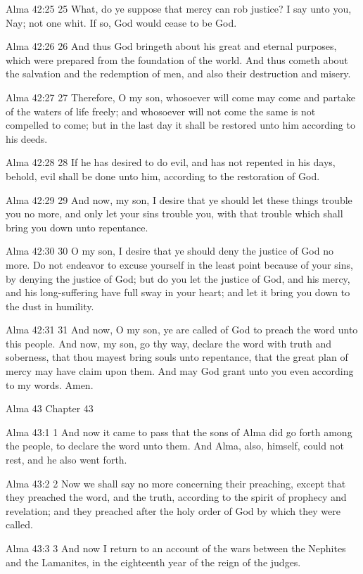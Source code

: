 Alma 42:25
 25 What, do ye suppose that mercy can rob justice? I say unto
you, Nay; not one whit. If so, God would cease to be God.

Alma 42:26
 26 And thus God bringeth about his great and eternal purposes,
which were prepared from the foundation of the world. And thus
cometh about the salvation and the redemption of men, and also
their destruction and misery.

Alma 42:27
 27 Therefore, O my son, whosoever will come may come and partake
of the waters of life freely; and whosoever will not come the
same is not compelled to come; but in the last day it shall be
restored unto him according to his deeds.

Alma 42:28
 28 If he has desired to do evil, and has not repented in his
days, behold, evil shall be done unto him, according to the
restoration of God.

Alma 42:29
 29 And now, my son, I desire that ye should let these things
trouble you no more, and only let your sins trouble you, with
that trouble which shall bring you down unto repentance.

Alma 42:30
 30 O my son, I desire that ye should deny the justice of God no
more. Do not endeavor to excuse yourself in the least point
because of your sins, by denying the justice of God; but do you
let the justice of God, and his mercy, and his long-suffering
have full sway in your heart; and let it bring you down to the
dust in humility.

Alma 42:31
 31 And now, O my son, ye are called of God to preach the word
unto this people. And now, my son, go thy way, declare the word
with truth and soberness, that thou mayest bring souls unto
repentance, that the great plan of mercy may have claim upon
them. And may God grant unto you even according to my words.
Amen.

Alma 43
Chapter 43

Alma 43:1
 1 And now it came to pass that the sons of Alma did go forth
among the people, to declare the word unto them. And Alma, also,
himself, could not rest, and he also went forth.

Alma 43:2
 2 Now we shall say no more concerning their preaching, except
that they preached the word, and the truth, according to the
spirit of prophecy and revelation; and they preached after the
holy order of God by which they were called.

Alma 43:3
 3 And now I return to an account of the wars between the
Nephites and the Lamanites, in the eighteenth year of the reign
of the judges.

